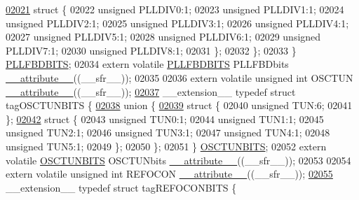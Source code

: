 \begin{DoxyCode}
\hypertarget{a00009_source_l02021}{}\hyperlink{a00009}{02021}     \textcolor{keyword}{struct }\{
02022       \textcolor{keywordtype}{unsigned} PLLDIV0:1;
02023       \textcolor{keywordtype}{unsigned} PLLDIV1:1;
02024       \textcolor{keywordtype}{unsigned} PLLDIV2:1;
02025       \textcolor{keywordtype}{unsigned} PLLDIV3:1;
02026       \textcolor{keywordtype}{unsigned} PLLDIV4:1;
02027       \textcolor{keywordtype}{unsigned} PLLDIV5:1;
02028       \textcolor{keywordtype}{unsigned} PLLDIV6:1;
02029       \textcolor{keywordtype}{unsigned} PLLDIV7:1;
02030       \textcolor{keywordtype}{unsigned} PLLDIV8:1;
02031     \};
02032   \};
02033 \} \hyperlink{a00008_d1/daa/a00638}{PLLFBDBITS};
02034 \textcolor{keyword}{extern} \textcolor{keyword}{volatile} \hyperlink{a00008_d1/daa/a00638}{PLLFBDBITS} PLLFBDbits \hyperlink{a00009_a493c46f03454991ccc5aa7a6e1dfb2a7}{\_\_attribute\_\_}((\_\_sfr\_\_));
02035 
02036 \textcolor{keyword}{extern} \textcolor{keyword}{volatile} \textcolor{keywordtype}{unsigned} \textcolor{keywordtype}{int}  OSCTUN \hyperlink{a00009_a493c46f03454991ccc5aa7a6e1dfb2a7}{\_\_attribute\_\_}((\_\_sfr\_\_));
\hypertarget{a00009_source_l02037}{}\hyperlink{a00008}{02037} \_\_extension\_\_ \textcolor{keyword}{typedef} \textcolor{keyword}{struct }tagOSCTUNBITS \{
\hypertarget{a00009_source_l02038}{}\hyperlink{a00009}{02038}   \textcolor{keyword}{union }\{
\hypertarget{a00009_source_l02039}{}\hyperlink{a00009}{02039}     \textcolor{keyword}{struct }\{
02040       \textcolor{keywordtype}{unsigned} TUN:6;
02041     \};
\hypertarget{a00009_source_l02042}{}\hyperlink{a00009}{02042}     \textcolor{keyword}{struct }\{
02043       \textcolor{keywordtype}{unsigned} TUN0:1;
02044       \textcolor{keywordtype}{unsigned} TUN1:1;
02045       \textcolor{keywordtype}{unsigned} TUN2:1;
02046       \textcolor{keywordtype}{unsigned} TUN3:1;
02047       \textcolor{keywordtype}{unsigned} TUN4:1;
02048       \textcolor{keywordtype}{unsigned} TUN5:1;
02049     \};
02050   \};
02051 \} \hyperlink{a00008_d4/d10/a00635}{OSCTUNBITS};
02052 \textcolor{keyword}{extern} \textcolor{keyword}{volatile} \hyperlink{a00008_d4/d10/a00635}{OSCTUNBITS} OSCTUNbits \hyperlink{a00009_a493c46f03454991ccc5aa7a6e1dfb2a7}{\_\_attribute\_\_}((\_\_sfr\_\_));
02053 
02054 \textcolor{keyword}{extern} \textcolor{keyword}{volatile} \textcolor{keywordtype}{unsigned} \textcolor{keywordtype}{int}  REFOCON \hyperlink{a00009_a493c46f03454991ccc5aa7a6e1dfb2a7}{\_\_attribute\_\_}((\_\_sfr\_\_));
\hypertarget{a00009_source_l02055}{}\hyperlink{a00008}{02055} \_\_extension\_\_ \textcolor{keyword}{typedef} \textcolor{keyword}{struct }tagREFOCONBITS \{

\end{DoxyCode}
